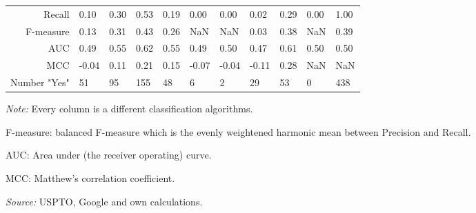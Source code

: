 \begin{table}
\begin{small}
\begin{threeparttable}
\begin{tabular}{rllllllllll}
Recall & 0.10 & 0.30 & 0.53 & 0.19 & 0.00 & 0.00 & 0.02 & 0.29 & 0.00 & 1.00  \tabularnewline 
F-measure & 0.13 & 0.31 & 0.43 & 0.26 & NaN & NaN & 0.03 & 0.38 & NaN & 0.39  \tabularnewline 
AUC & 0.49 & 0.55 & 0.62 & 0.55 & 0.49 & 0.50 & 0.47 & 0.61 & 0.50 & 0.50  \tabularnewline 
MCC & -0.04 & 0.11 & 0.21 & 0.15 & -0.07 & -0.04 & -0.11 & 0.28 & NaN & NaN  \tabularnewline 
Number "Yes" & 51 & 95 & 155 & 48 & 6 & 2 & 29 & 53 & 0 & 438  \tabularnewline 
\bottomrule 
\end{tabular} 
\begin{tablenotes}
\small
\item\textit{Note:} Every column is a different classification algorithms.
\item F-measure: balanced F-measure which is the evenly weightened harmonic mean between Precision and Recall. 
\item AUC: Area under (the receiver operating) curve.
\item MCC: Matthew's correlation coefficient.
\item\textit{Source:} USPTO, Google and own calculations.
\end{tablenotes}
\end{threeparttable}
\end{small}
\end{table}
